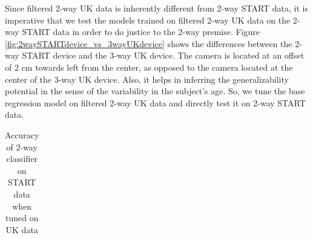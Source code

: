Since filtered 2-way UK data is inherently different from 2-way START data, it is imperative that we test the models trained on filtered 2-way UK data on the 2-way START data in order to do justice to the 2-way premise. Figure \ref{fig:2waySTARTdevice_vs_3wayUKdevice} shows the differences between the 2-way START device and the 3-way UK device. The camera is located at an offset of 2 cm towards left from the center, as opposed to the camera located at the center of the 3-way UK device. Also, it helps in inferring the generalizability potential in the sense of the variability in the subject's age. So, we tune the base regression model on filtered 2-way UK data and directly test it on 2-way START data.

\begin{table}[h]
  \centering
    \caption{Accuracy of 2-way classifier on START data when tuned on UK data}
    \label{tab:2way_tune-UK_test-START}
    \begin{tabular}{|c||c|c|c|c|}
      \hline

\end{tabular}
\end{table}
